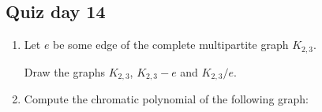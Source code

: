 \documentclass[12pt]{article}
\begin{document}
\subsection*{Quiz day 14}


\begin{enumerate}
    \item Let $e$ be some edge of the complete multipartite graph $K_{2,3}$. 
    
    Draw the graphs $K_{2,3}$, $K_{2,3} - e$ and $K_{2,3}/e$.
    \item Compute the chromatic polynomial of the following graph:
    


\end{enumerate}
\end{document}
